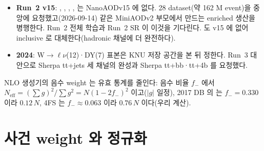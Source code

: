 \begin{itemize}
  \item \textbf{Run~2 v15}: , , , ,  는 NanoAODv15 에 없다. 28 dataset(약 162 M event)을 중앙에
        요청했고(2026-09-14) 같은 MiniAODv2 부모에서 만드는 enriched 생산을 병행한다. Run~2 전체 학습과 Run~2 SR 이 이것을
        기다린다.  도 v15 에 없어 inclusive  로 대체한다(hadronic 채널에 더 완전하다).
  \item \textbf{2024}: W$\to\ell\nu$(12)·DY(7) 표본은 KNU 저장 공간을 본 뒤 정한다. Run~3 \ttbar 대안으로 Sherpa tt+jets 세
        채널의 완성과 Sherpa tt+bb·tt+4b 를 요청했다.
\end{itemize}
NLO 생성기의 음수 weight 는 유효 통계를 줄인다: 음수 비율 $f_-$ 에서 $N_{\mathrm{eff}}=(\sum g)^{2}/\sum g^{2}=N(1-2f_-)^{2}$ 이고($|g|$ 일정), 2017 DB 의  는
$f_-=0.330$ 이라 $0.12\,N$, 4FS \ttbb 는 $f_-\approx0.063$ 이라 $0.76\,N$ 이다(우리 계산).

\section{사건 weight 와 정규화}\label{sec:samples-weights}

